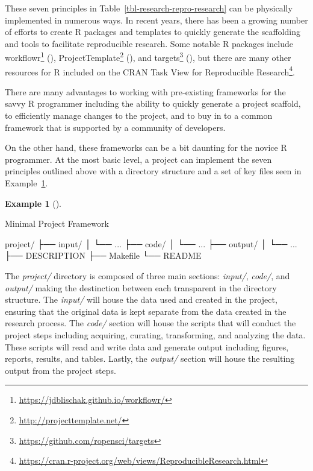\documentclass[
  letterpaper,
]{book}
\newenvironment{Shaded}{\begin{snugshade}}{\end{snugshade}}
\newcommand{\ExtensionTok}[1]{\textcolor[rgb]{0.00,0.00,0.00}{#1}}
\newcommand{\NormalTok}[1]{\textcolor[rgb]{0.00,0.00,0.00}{#1}}
\theoremstyle{definition}
\newtheorem{example}{Example}[chapter]
\theoremstyle{remark}
\DeclareRobustCommand{\href}[2]{#2\footnote{\url{#1}}}
\begin{document}
These seven principles in Table~\ref{tbl-research-repro-research} can be
physically implemented in numerous ways. In recent years, there has been
a growing number of efforts to create R packages and templates to
quickly generate the scaffolding and tools to facilitate reproducible
research. Some notable R packages include
\href{https://jdblischak.github.io/workflowr/}{workflowr}
(),
\href{http://projecttemplate.net/}{ProjectTemplate}
(), and
\href{https://github.com/ropensci/targets}{targets}
(), but there are many other
resources for R included on the
\href{https://cran.r-project.org/web/views/ReproducibleResearch.html}{CRAN
Task View for Reproducible Research}.

There are many advantages to working with pre-existing frameworks for
the savvy R programmer including the ability to quickly generate a
project scaffold, to efficiently manage changes to the project, and to
buy in to a common framework that is supported by a community of
developers.

On the other hand, these frameworks can be a bit daunting for the novice
R programmer. At the most basic level, a project can implement the seven
principles outlined above with a directory structure and a set of key
files seen in Example~\ref{exm-research-basic-project}.

\begin{example}[]\protect\hypertarget{exm-research-basic-project}{}\label{exm-research-basic-project}

Minimal Project Framework

\begin{Shaded}
\begin{Highlighting}[]
\ExtensionTok{project/}
\ExtensionTok{├──}\NormalTok{ input/}
\ExtensionTok{│}\NormalTok{   └── ...}
\ExtensionTok{├──}\NormalTok{ code/}
\ExtensionTok{│}\NormalTok{   └── ...}
\ExtensionTok{├──}\NormalTok{ output/}
\ExtensionTok{│}\NormalTok{   └── ...}
\ExtensionTok{├──}\NormalTok{ DESCRIPTION}
\ExtensionTok{├──}\NormalTok{ Makefile}
\ExtensionTok{└──}\NormalTok{ README}
\end{Highlighting}
\end{Shaded}

\end{example}

The \emph{project/} directory is composed of three main sections:
\emph{input/}, \emph{code/}, and \emph{output/} making the destinction
between each transparent in the directory structure. The \emph{input/}
will house the data used and created in the project, ensuring that the
original data is kept separate from the data created in the research
process. The \emph{code/} section will house the scripts that will
conduct the project steps including acquiring, curating, transforming,
and analyzing the data. These scripts will read and write data and
generate output including figures, reports, results, and tables. Lastly,
the \emph{output/} section will house the resulting output from the
project steps.
\end{document}
